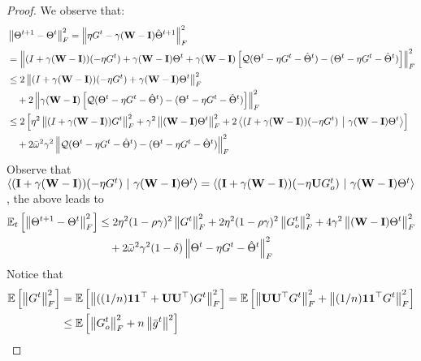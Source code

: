 \documentclass[10pt]{article} %
\theoremstyle{plain}
\theoremstyle{definition}
\theoremstyle{remark}
\newcommand{\bw}{\bar{\omega}}
\newcommand{\avgg}{\bar{g}}
\newcommand{\dotp}[2]{\left\langle{#1}\ \middle|\ {#2}\right\rangle}
\newcommand{\norm}[1]{\left\| #1 \right\|}
\newcommand{\nl}{\nonumber\\}
\newcommand{\W}{{\bf W}}
\newcommand{\U}{{\bf U}}
\newcommand{\I}{{\bf I}}
\begin{document}
\begin{proof}
    We observe that:
\begin{align}
    & \norm{\Theta^{t+1} - \Theta^t}_F^2 = \norm{ \eta G^t - \gamma(\W-\I) \hat{\Theta}^{t+1} }_F^2 \nonumber \\
    & = \norm{(I + \gamma (\W-\I)) (- \eta G^t) + \gamma(\W-\I)\Theta ^t + \gamma(\W-\I) \left[ {\cal Q}(\Theta^t - \eta G^t - \hat{\Theta}^t ) - (\Theta^t - \eta G^t-\hat{\Theta}^t)\right]}_F^2 \nonumber \\
    & \leq 2\norm{( I + \gamma(\W-\I) ) (- \eta G^t) + \gamma(\W-\I)\Theta^t}_F^2 \nonumber \\
    & \quad + 2\norm{\gamma(\W-\I)\left[ {\cal Q}(\Theta^t - \eta G^t - \hat{\Theta}^t ) - (\Theta^t - \eta G^t-\hat{\Theta}^t)\right]}_F^2 \nl 
    & \leq 2 \left[ \eta^2 \norm{ (I+\gamma(\W-\I)) G^t }_F^2 + \gamma^2 \norm{ (\W-\I) \Theta^t }_F^2 + 2 \dotp{( I + \gamma(\W-\I) ) (- \eta G^t)}{\gamma(\W-\I)\Theta^t}\right] \nl 
    & \quad + 2 \bw^2 \gamma^2 \norm{ {\cal Q}(\Theta^t - \eta G^t - \hat{\Theta}^t ) - (\Theta^t - \eta G^t-\hat{\Theta}^t) }_F^2
\end{align}
Observe that $\dotp{( \I + \gamma(\W-\I) ) (- \eta G^t)}{\gamma(\W-\I)\Theta^t} = \dotp{( \I + \gamma(\W-\I) ) (- \eta \U G_o^t)}{\gamma(\W-\I)\Theta^t}$,
the above leads to
\begin{align}
    \mathbb{E}_t \left[ \norm{\Theta^{t+1} - \Theta^t}_F^2 \right] & \leq 2\eta^2(1-\rho\gamma)^2\norm{G^t}_F^2 + 2\eta^2(1-\rho\gamma)^2\norm{G_o^t}_F^2 + 4\gamma^2\norm{(\W-\I)\Theta^t}_F^2 \nl 
    & \quad + 2 \bw^2 \gamma^2(1-\delta)\norm{\Theta^t - \eta G^t - \hat{\Theta}^t}_F^2 \label{int:Theta_diff_a}
\end{align}
Notice that 
\begin{align}
    \mathbb{E} \left[ \norm{G^t}_F^2 \right] & = \mathbb{E} \left[ \norm{ ( (1/n) {\bf 11}^\top + \U\U^\top ) G^t }_F^2 \right] = \mathbb{E} \left[ \norm{  \U\U^\top G^t }_F^2 + \norm{ (1/n){\bf 11}^\top G^t }_F^2 \right]
    \nl & \leq \mathbb{E} \left[ \norm{G_o^t}_F^2 + n \norm{ \avgg^t }^2 \right] \label{int:Theta_diff_c}
\end{align}

\end{proof}
\end{document}
